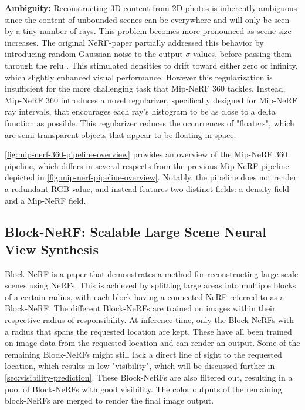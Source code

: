\textbf{Ambiguity:}
Reconstructing 3D content from 2D photos is inherently ambiguous since the content of unbounded scenes can be everywhere and will only be seen by a tiny number of rays. This problem becomes more pronounced as scene size increases. The original NeRF-paper partially addressed this behavior by introducing random Gaussian noise to the output $\sigma$ values, before passing them through the \acrfull{relu} \cite{agarap_deep_2019}. This stimulated densities to drift toward either zero or infinity, which slightly enhanced visual performance. However this regularization is insufficient for the more challenging task that Mip-NeRF 360 tackles. Instead, Mip-NeRF 360 introduces a novel regularizer, specifically designed for Mip-NeRF ray intervals, that encourages each ray's histogram to be as close to a delta function as possible. This regularizer reduces the occurrences of "floaters", which are semi-transparent objects that appear to be floating in space.



\autoref{fig:mip-nerf-360-pipeline-overview} provides an overview of the Mip-NeRF 360 pipeline, which differs in several respects from the previous Mip-NeRF pipeline depicted in \autoref{fig:mip-nerf-pipeline-overview}. Notably, the pipeline does not render a redundant RGB value, and instead features two distinct fields: a density field and a Mip-NeRF field.


\subsection[Block-NeRF]{Block-NeRF: Scalable Large Scene Neural View Synthesis} \label{sec:block-nerf}
Block-NeRF \cite{tancik_block-nerf_2022} is a paper that demonstrates a method for reconstructing large-scale scenes using NeRFs. This is achieved by splitting large areas into multiple blocks of a certain radius, with each block having a connected NeRF referred to as a Block-NeRF. The different Block-NeRFs are trained on images within their respective radius of responsibility. At inference time, only the Block-NeRFs with a radius that spans the requested location are kept. These have all been trained on image data from the requested location and can render an output. Some of the remaining Block-NeRFs might still lack a direct line of sight to the requested location, which results in low "visibility", which will be discussed further in \autoref{sec:visibility-prediction}. These Block-NeRFs are also filtered out, resulting in a pool of Block-NeRFs with good visibility. The color outputs of the remaining block-NeRFs are merged to render the final image output.

